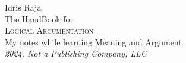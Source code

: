 \begin{titlepage}
  \raggedleft
  {\Large Idris Raja\\[1in]}
  {\large The HandBook for\\}
  {\Huge\scshape Logical Argumentation\\[.2in]}
  {\large My notes while learning Meaning and Argument\\}
  \vfill
    {\itshape 2024, Not a Publishing Company, LLC}
\end{titlepage}
